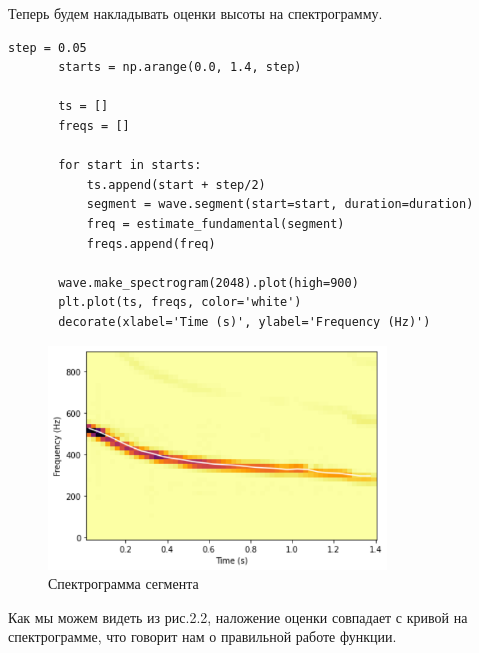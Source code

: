 \documentclass[a4paper,12pt]{report}
\begin{document}
    Теперь будем накладывать оценки высоты на спектрограмму.
\begin{lstlisting}[caption=Наложение оценки высоты на спектрограмму]
       step = 0.05
       starts = np.arange(0.0, 1.4, step)

       ts = []
       freqs = []

       for start in starts:
           ts.append(start + step/2)
           segment = wave.segment(start=start, duration=duration)
           freq = estimate_fundamental(segment)
           freqs.append(freq)

       wave.make_spectrogram(2048).plot(high=900)
       plt.plot(ts, freqs, color='white')
       decorate(xlabel='Time (s)', ylabel='Frequency (Hz)')
\end{lstlisting} 
\begin{figure}[H]
        \centering
        \includegraphics[width=0.8\textwidth]{fig2-2.PNG}
        \caption{Спектрограмма сегмента}
        \label{fig:fig2-2}
\end{figure} 
    
    Как мы можем видеть из рис.2.2, наложение оценки совпадает с кривой на спектрограмме, что говорит нам о правильной работе функции.
\end{document}
